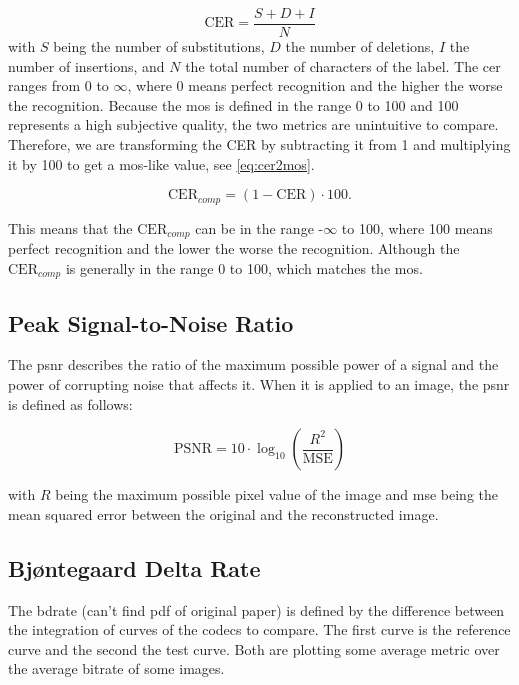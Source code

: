 \begin{equation}
    \text{CER} = \frac{S + D + I}{N}
    \label{eq:cer}
\end{equation}
with \(S\) being the number of substitutions, \(D\) the number of deletions, \(I\) the number of insertions, and \(N\) the total number of characters of the label.
The \gls{cer} ranges from 0 to $\infty$, where 0 means perfect recognition and the higher the worse the recognition.
Because the \gls{mos} is defined in the range 0 to 100 and 100 represents a high subjective quality, the two metrics are unintuitive to compare.
Therefore, we are transforming the CER by subtracting it from 1 and multiplying it by 100 to get a \gls{mos}-like value, see \autoref{eq:cer2mos}.

\begin{equation}
    \text{CER}_{comp} = (1 - \text{CER}) \cdot 100.
    \label{eq:cer2mos}
\end{equation}

This means that the $\text{CER}_{comp}$ can be in the range -$\infty$ to 100, where 100 means perfect recognition and the lower the worse the recognition.
Although the $\text{CER}_{comp}$ is generally in the range 0 to 100, which matches the \gls{mos}.

\subsection{Peak Signal-to-Noise Ratio}
\label{subsec:psnr}

The \gls{psnr} \cite{PSNRvsSSIM_2010} describes the ratio of the maximum possible power of a signal and the power of corrupting noise that affects it.
When it is applied to an image, the \gls{psnr} is defined as follows:

\begin{equation}
    \text{PSNR} = 10 \cdot \log_{10} \left( \frac{R^2}{\text{MSE}} \right)
    \label{eq:psnr}
\end{equation}

with \(R\) being the maximum possible pixel value of the image and \gls{mse} being the mean squared error between the original and the reconstructed image.

\subsection{Bjøntegaard Delta Rate}
\label{subsec:bdrate}

The \gls{bdrate} \cite{bdrate_original_2001}\cite{bdrate_beyond_2022} (can't find pdf of original paper) is defined by the difference between the integration of curves of the codecs to compare.
The first curve is the reference curve and the second the test curve.
Both are plotting some average metric over the average bitrate of some images.

